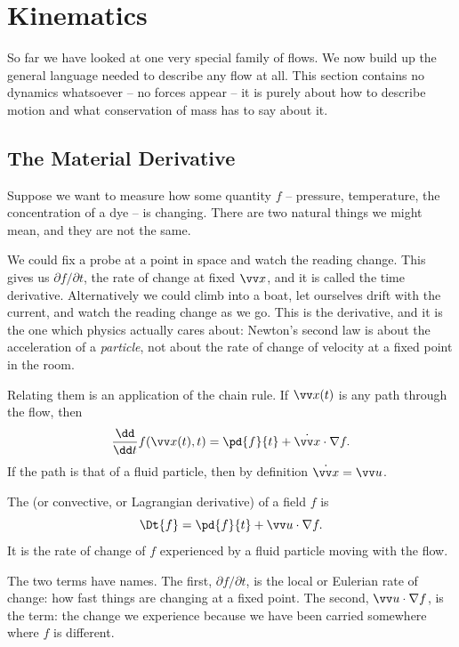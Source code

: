 \section{Kinematics} \label{sec:kinematics}

So far we have looked at one very special family of flows. We now build up the general language needed to describe any flow at all. This section contains no dynamics whatsoever -- no forces appear -- it is purely about how to describe motion and what conservation of mass has to say about it.

\subsection{The Material Derivative}

Suppose we want to measure how some quantity $f$ -- pressure, temperature, the concentration of a dye -- is changing. There are two natural things we might mean, and they are not the same.

We could fix a probe at a point in space and watch the reading change. This gives us $\partial f /\partial t$, the rate of change at fixed $\vv x$, and it is called the  time derivative. Alternatively we could climb into a boat, let ourselves drift with the current, and watch the reading change as we go. This is the  derivative, and it is the one which physics actually cares about: Newton's second law is about the acceleration of a \emph{particle}, not about the rate of change of velocity at a fixed point in the room.

Relating them is an application of the chain rule. If $\vv x(t)$ is any path through the flow, then
$$
\frac{\dd}{\dd t} f(\vv x(t), t) = \pd{f}{t} + \dot{\vv x}\cdot \nabla f.
$$
If the path is that of a fluid particle, then by definition $\dot{\vv x} = \vv u$.

\begin{definition}
	The  (or convective, or Lagrangian derivative) of a field $f$ is
	$$
	\Dt{f} = \pd{f}{t} + \vv u \cdot \nabla f.
	$$
	It is the rate of change of $f$ experienced by a fluid particle moving with the flow.
\end{definition}

The two terms have names. The first, $\partial f/\partial t$, is the local or Eulerian rate of change: how fast things are changing at a fixed point. The second, $\vv u \cdot \nabla f$, is the  term: the change we experience because we have been carried somewhere where $f$ is different.

